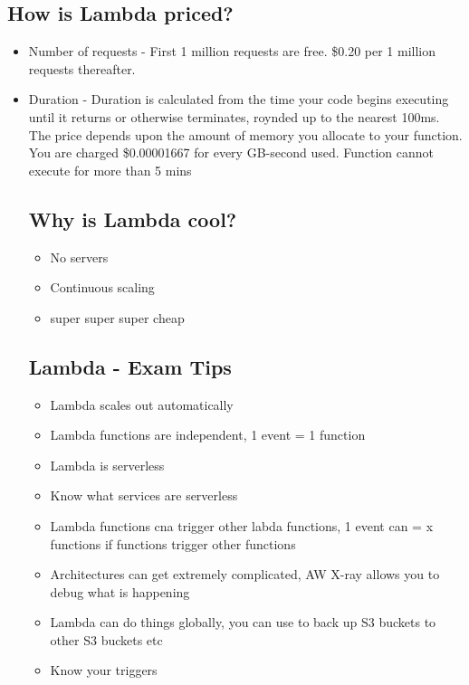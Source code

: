 \documentclass{article}
\begin{document}
\subsection{How is Lambda priced?}
\begin{itemize}
\item
Number of requests - First 1 million requests are free. \$0.20 per 1 million requests thereafter.

\item
Duration - Duration is calculated from the time your code begins executing until it returns or otherwise terminates, roynded up to the nearest 100ms. The price depends upon the amount of memory you allocate to your function. You are charged \$0.00001667 for every GB-second used. Function cannot execute for more than 5 mins

\subsection{Why is Lambda cool?}
\begin{itemize}
\item
No servers

\item
Continuous scaling

\item
super super super cheap
\end{itemize}

\subsection{Lambda - Exam Tips}
\begin{itemize}
\item
Lambda scales out automatically

\item
Lambda functions are independent, 1 event = 1 function

\item
Lambda is serverless

\item
Know what services are serverless

\item
Lambda functions cna trigger other labda functions, 1 event can = x functions if functions trigger other functions

\item
Architectures can get extremely complicated, AW X-ray allows you to debug what is happening

\item
Lambda can do things globally, you can use to back up S3 buckets to other S3 buckets etc

\item
Know your triggers
\end{itemize}


\end{itemize}
\end{document}
